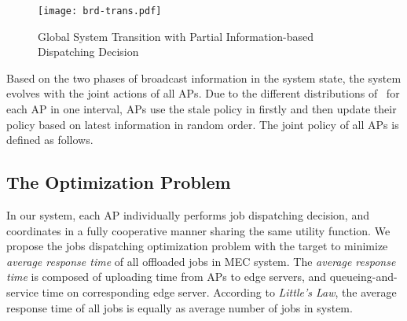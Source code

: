 \begin{figure}[htp]
    \centering
    \texttt{[image: brd-trans.pdf]}
    \caption{Global System Transition with Partial Information-based Dispatching Decision}
    \label{fig:brd-trans}
\end{figure}

Based on the two phases of broadcast information in the system state, the system evolves with the joint actions of all APs.
Due to the different distributions of \brlatency~for each AP in one interval, APs use the stale policy in firstly and then update their policy based on latest information in random order.
The joint policy of all APs is defined as follows.

\subsection{The Optimization Problem}
In our system, each AP individually performs job dispatching decision, and coordinates in a fully cooperative manner sharing the same utility function.
We propose the jobs dispatching optimization problem with the target to minimize \emph{average response time} of all offloaded jobs in MEC system.
The \emph{average response time} is composed of uploading time from APs to edge servers, and queueing-and-service time on corresponding edge server. According to \emph{Little's Law}, the average response time of all jobs is equally as average number of jobs in system.

